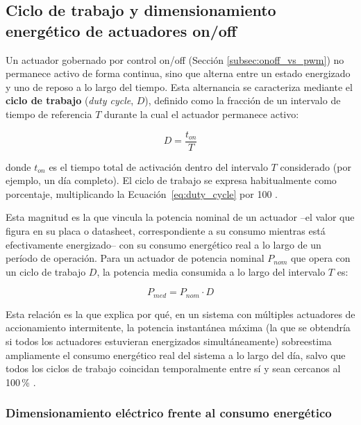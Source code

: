 \subsection{Ciclo de trabajo y dimensionamiento energético de actuadores on/off}
\label{subsec:duty_cycle}

Un actuador gobernado por control on/off (Sección \ref{subsec:onoff_vs_pwm}) no permanece activo de forma continua, sino que alterna entre un estado energizado y uno de reposo a lo largo del tiempo. Esta alternancia se caracteriza mediante el \textbf{ciclo de trabajo} (\textit{duty cycle}, $D$), definido como la fracción de un intervalo de tiempo de referencia $T$ durante la cual el actuador permanece activo:

\begin{equation}
    D = \frac{t_{on}}{T}
    \label{eq:duty_cycle}
\end{equation}

\noindent donde $t_{on}$ es el tiempo total de activación dentro del intervalo $T$ considerado (por ejemplo, un día completo). El ciclo de trabajo se expresa habitualmente como porcentaje, multiplicando la Ecuación~\ref{eq:duty_cycle} por 100 \cite{rashid2014power}.

Esta magnitud es la que vincula la potencia nominal de un actuador --el valor que figura en su placa o datasheet, correspondiente a su consumo mientras está efectivamente energizado-- con su consumo energético real a lo largo de un período de operación. Para un actuador de potencia nominal $P_{nom}$ que opera con un ciclo de trabajo $D$, la potencia media consumida a lo largo del intervalo $T$ es:

\begin{equation}
    P_{med} = P_{nom} \cdot D
    \label{eq:potencia_media}
\end{equation}

\noindent Esta relación es la que explica por qué, en un sistema con múltiples actuadores de accionamiento intermitente, la potencia instantánea máxima (la que se obtendría si todos los actuadores estuvieran energizados simultáneamente) sobreestima ampliamente el consumo energético real del sistema a lo largo del día, salvo que todos los ciclos de trabajo coincidan temporalmente entre sí y sean cercanos al 100\,\% \cite{rashid2014power}.

\subsubsection{Dimensionamiento eléctrico frente al consumo energético}

